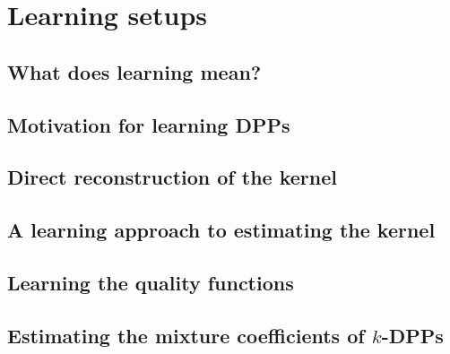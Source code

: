 \chapter{Learning setups}

\section{What does learning mean?}

\section{Motivation for learning DPPs}

\section{Direct reconstruction of the kernel}

\section{A learning approach to estimating the kernel}

\section{Learning the quality functions}

\section{Estimating the mixture coefficients of \(k\)-DPPs}